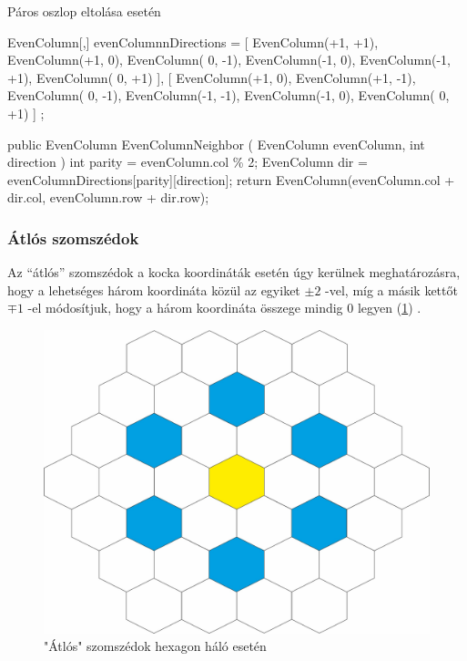 Páros oszlop eltolása esetén
\begin{cpp}
EvenColumn[,] evenColumnnDirections = 
{ 
   [ 
      EvenColumn(+1, +1), EvenColumn(+1,  0), EvenColumn( 0, -1),
      EvenColumn(-1,  0), EvenColumn(-1, +1), EvenColumn( 0, +1) 
   ],
   [  
      EvenColumn(+1,  0), EvenColumn(+1, -1), EvenColumn( 0, -1),
      EvenColumn(-1, -1), EvenColumn(-1,  0), EvenColumn( 0, +1) 
   ]
};

public EvenColumn EvenColumnNeighbor
(
   EvenColumn evenColumn, 
   int direction
)
{
   int parity = evenColumn.col \% 2;
   EvenColumn dir = evenColumnDirections[parity][direction];
   return EvenColumn(evenColumn.col + dir.col, evenColumn.row + dir.row);
}   
\end{cpp}

\subsubsection{Átlós szomszédok}

\noindent Az “átlós” szomszédok a kocka koordináták esetén úgy kerülnek meghatározásra, hogy a lehetséges három koordináta közül az egyiket $ \pm 2$ -vel, míg a másik kettőt $\mp 1$ -el módosítjuk, hogy a három koordináta összege mindig $0$ legyen (\ref{fig:Diagonals}) \cite{redblobgamesHexagonalGrids}.

\begin{figure}[h!]
\centering
\includegraphics[scale=0.3]{kepek/Diagonals.jpg}
\caption{"Átlós" szomszédok hexagon háló esetén}
\label{fig:Diagonals}
\end{figure}

